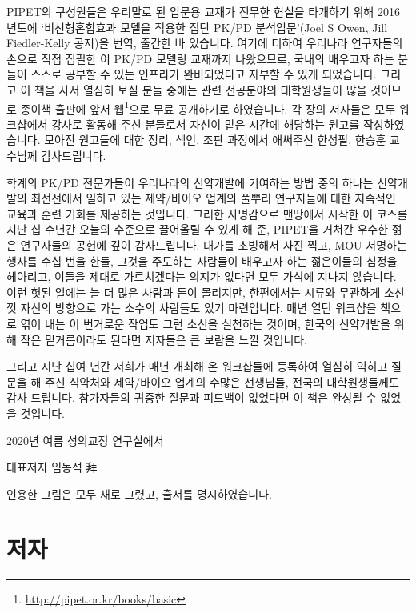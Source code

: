 \documentclass[
  10pt,
  krantz2,
  a4paper]{krantz}
\makeatletter
\newenvironment{kframe}{%
\medskip{}
\setlength{\fboxsep}{.8em}
 \def\at@end@of@kframe{}%
 \ifinner\ifhmode%
  \def\at@end@of@kframe{\end{minipage}}%
  \begin{minipage}{\columnwidth}%
 \fi\fi%
 \def\FrameCommand##1{\hskip\@totalleftmargin \hskip-\fboxsep
 \colorbox{shadecolor}{##1}\hskip-\fboxsep
     \hskip-\linewidth \hskip-\@totalleftmargin \hskip\columnwidth}%
 \MakeFramed {\advance\hsize-\width
   \@totalleftmargin\z@ \linewidth\hsize
   \@setminipage}}%
 {\par\unskip\endMakeFramed%
 \at@end@of@kframe}
\newenvironment{rmdblock}[1]
  {
  \begin{itemize}
  \renewcommand{\labelitemi}{
    \raisebox{-.7\height}[0pt][0pt]{
      {\setkeys{Gin}{width=3em,keepaspectratio}\texttt{[image: images/\#1]}}
    }
  }
  \setlength{\fboxsep}{1em}
  \begin{kframe}
  \item
  }
  {
  \end{kframe}
  \end{itemize}
  }
\newenvironment{rmdtip}
  {\begin{rmdblock}{tip}}
  {\end{rmdblock}}
\theoremstyle{definition}
\theoremstyle{definition}
\theoremstyle{definition}
\theoremstyle{remark}
\makeatother
\begin{document}
PIPET의 구성원들은 우리말로 된 입문용 교재가 전무한 현실을 타개하기 위해 2016년도에 `비선형혼합효과 모델을 적용한 집단 PK/PD 분석입문'(Joel S Owen, Jill Fiedler-Kelly 공저)을 번역, 출간한 바 있습니다. 여기에 더하여 우리나라 연구자들의 손으로 직접 집필한 이 PK/PD 모델링 교재까지 나왔으므로, 국내의 배우고자 하는 분들이 스스로 공부할 수 있는 인프라가 완비되었다고 자부할 수 있게 되었습니다. 그리고 이 책을 사서 열심히 보실 분들 중에는 관련 전공분야의 대학원생들이 많을 것이므로 종이책 출판에 앞서 웹\footnote{\url{http://pipet.or.kr/books/basic}}으로 무료 공개하기로 하였습니다. 각 장의 저자들은 모두 워크샵에서 강사로 활동해 주신 분들로서 자신이 맡은 시간에 해당하는 원고를 작성하였습니다. 모아진 원고들에 대한 정리, 색인, 조판 과정에서 애써주신 한성필, 한승훈 교수님께 감사드립니다.

학계의 PK/PD 전문가들이 우리나라의 신약개발에 기여하는 방법 중의 하나는 신약개발의 최전선에서 일하고 있는 제약/바이오 업계의 풀뿌리 연구자들에 대한 지속적인 교육과 훈련 기회를 제공하는 것입니다. 그러한 사명감으로 맨땅에서 시작한 이 코스를 지난 십 수년간 오늘의 수준으로 끌어올릴 수 있게 해 준, PIPET을 거쳐간 우수한 젊은 연구자들의 공헌에 깊이 감사드립니다. 대가를 초빙해서 사진 찍고, MOU 서명하는 행사를 수십 번을 한들, 그것을 주도하는 사람들이 배우고자 하는 젊은이들의 심정을 헤아리고, 이들을 제대로 가르치겠다는 의지가 없다면 모두 가식에 지나지 않습니다. 이런 헛된 일에는 늘 더 많은 사람과 돈이 몰리지만, 한편에서는 시류와 무관하게 소신껏 자신의 방향으로 가는 소수의 사람들도 있기 마련입니다. 매년 열던 워크샵을 책으로 엮어 내는 이 번거로운 작업도 그런 소신을 실천하는 것이며, 한국의 신약개발을 위해 작은 밑거름이라도 된다면 저자들은 큰 보람을 느낄 것입니다.

그리고 지난 십여 년간 저희가 매년 개최해 온 워크샵들에 등록하여 열심히 익히고 질문을 해 주신 식약처와 제약/바이오 업계의 수많은 선생님들, 전국의 대학원생들께도 감사 드립니다. 참가자들의 귀중한 질문과 피드백이 없었다면 이 책은 완성될 수 없었을 것입니다.

\hfill 2020년 여름 성의교정 연구실에서

\hfill 대표저자 임동석 拜

\mainmatter

\begin{rmdtip}
인용한 그림은 모두 새로 그렸고, 출서를 명시하였습니다.
\end{rmdtip}

\hypertarget{uxc800uxc790}{%
\section*{저자}\label{uxc800uxc790}}
\end{document}
